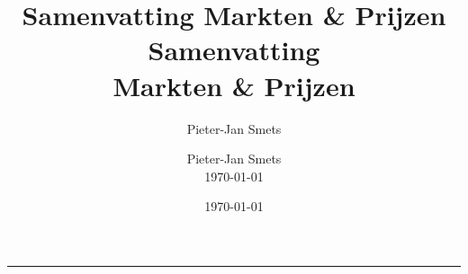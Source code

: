 \documentclass[10pt,a4paper]{article}
\author{Pieter-Jan Smets}
\title{Samenvatting Markten & Prijzen}
\date{\today}
\title{	\fontsize{50}{60}\selectfont
			\vspace*{0.7cm}
			\hfill Samenvatting 		\\[0.8cm]
			\hfill Markten \&	Prijzen\\[0.8cm]%
		}
\author{
		\hfill Pieter-Jan Smets\\
		\hfill \today \\
}
\makeatletter
\newcommand{\HRule}[1]{\hfill \rule{0.2\linewidth}{#1}} 	%
\def\printtitle{%
    {\centering \@title\par}}
\def\printauthor{%
    {\centering \large \@author}}
\makeatother
\begin{document}
\thispagestyle{empty}				%

\colorbox{grey}{
	\parbox[t]{1.0\linewidth}{
		\printtitle
		\vspace*{0.7cm}
	}
}

  	\vfill
\printauthor								%
\HRule{1pt}
\clearpage


\tableofcontents
\newpage










\end{document}
